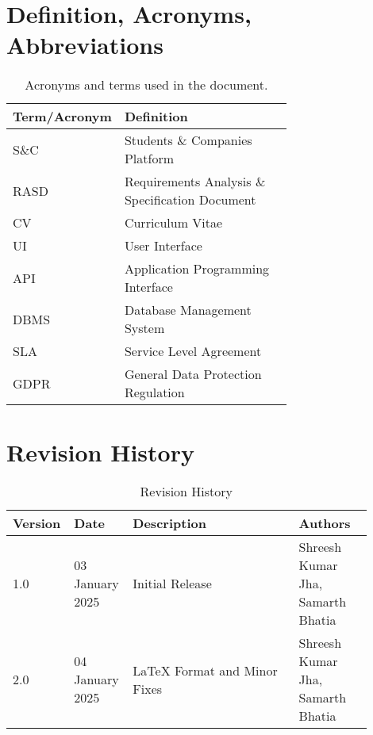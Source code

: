 \section{Definition, Acronyms, Abbreviations}
\label{sec:definition_acronyms_abbreviations}%
\begin{table}[H]
    \centering
    \begin{tabular}{ |l|p{0.7\linewidth}| }
        \hline
        \textbf{Term/Acronym} & \textbf{Definition} \\
        \hline
        S\&C  & Students \& Companies Platform \\
        \hline
        RASD  & Requirements Analysis \& Specification Document \\
        \hline
        CV    & Curriculum Vitae \\
        \hline
        UI    & User Interface \\
        \hline
        API   & Application Programming Interface \\
        \hline
        DBMS  & Database Management System \\
        \hline
        SLA   & Service Level Agreement \\
        \hline
        GDPR  & General Data Protection Regulation \\
        \hline
    \end{tabular}
    \caption{Acronyms and terms used in the document.}
    \label{tab:acronyms_sc}
\end{table}

\section{Revision History}
\label{sec:revision_history}

\begin{table}[H]
    \centering
    \begin{tabular}{ |p{0.1\linewidth}|p{0.15\linewidth}|p{0.45\linewidth}|p{0.2\linewidth}| }
        \hline
        \textbf{Version} & \textbf{Date} & \textbf{Description} & \textbf{Authors} \\
        \hline
        1.0 & 03 January 2025 & Initial Release & 
        Shreesh Kumar Jha, \newline
        Samarth Bhatia \\
        \hline
        2.0 & 04 January 2025 & LaTeX Format and Minor Fixes & 
        Shreesh Kumar Jha, \newline
        Samarth Bhatia \\
        \hline
    \end{tabular}
    \caption{Revision History}
    \label{tab:revision_history}
\end{table}

